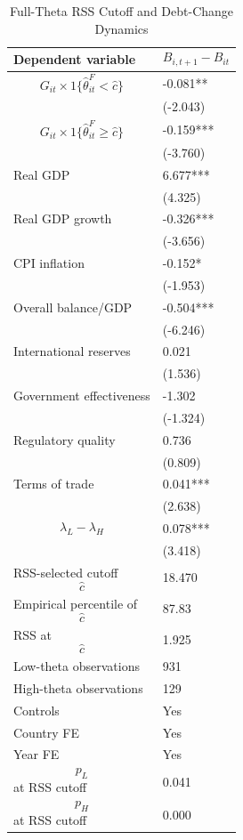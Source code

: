 \begin{table}[H]\centering
\begin{threeparttable}
\caption{Full-Theta RSS Cutoff and Debt-Change Dynamics}
\label{tab:deltaB_rss_cutoff_fulltheta}
\scriptsize
\begin{tabularx}{\textwidth}{lY}
\toprule
Dependent variable & $$B_{i,t+1}-B_{it}$$ \\
\midrule
$$G_{it}\times 1\{\widehat{\theta}^{F}_{it}<\widehat{c}\}$$ & -0.081** \\
 & (-2.043) \\
$$G_{it}\times 1\{\widehat{\theta}^{F}_{it}\geq\widehat{c}\}$$ & -0.159*** \\
 & (-3.760) \\
Real GDP & 6.677*** \\
 & (4.325) \\
Real GDP growth & -0.326*** \\
 & (-3.656) \\
CPI inflation & -0.152* \\
 & (-1.953) \\
Overall balance/GDP & -0.504*** \\
 & (-6.246) \\
International reserves & 0.021 \\
 & (1.536) \\
Government effectiveness & -1.302 \\
 & (-1.324) \\
Regulatory quality & 0.736 \\
 & (0.809) \\
Terms of trade & 0.041*** \\
 & (2.638) \\
$$\lambda_L-\lambda_H$$ & 0.078*** \\
 & (3.418) \\
\midrule
RSS-selected cutoff $$\widehat{c}$$ & 18.470 \\
Empirical percentile of $$\widehat{c}$$ & 87.83 \\
RSS at $$\widehat{c}$$ & 1.925 \\
Low-theta observations & 931 \\
High-theta observations & 129 \\
Controls & Yes \\
Country FE & Yes \\
Year FE & Yes \\
$$p_L$$ at RSS cutoff & 0.041 \\
$$p_H$$ at RSS cutoff & 0.000 \\

\end{tabularx}
\end{threeparttable}
\end{table}
